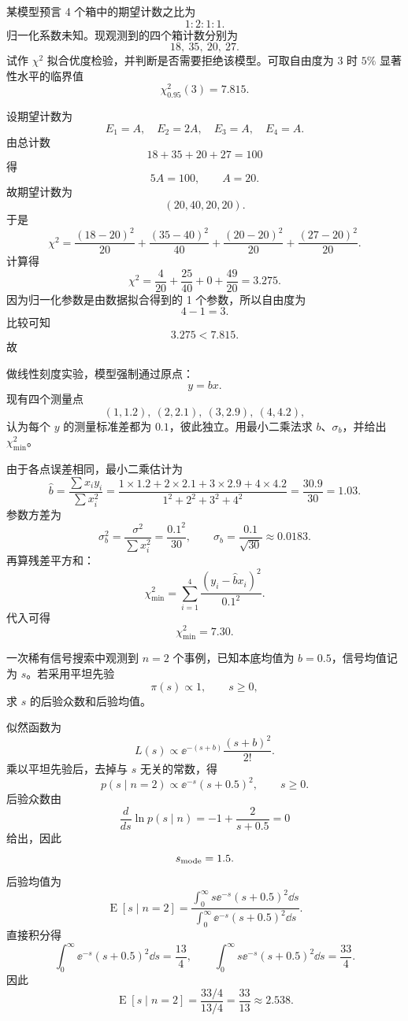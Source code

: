\begin{question}
某模型预言 4 个箱中的期望计数之比为
\[
1:2:1:1.
\]
归一化系数未知。现观测到的四个箱计数分别为
\[
18,\ 35,\ 20,\ 27.
\]
试作 $\chi^2$ 拟合优度检验，并判断是否需要拒绝该模型。可取自由度为 3 时 $5\%$ 显著性水平的临界值
\[
\chi^2_{0.95}(3)=7.815.
\]
\begin{solution}
设期望计数为
\[
E_1=A,\quad E_2=2A,\quad E_3=A,\quad E_4=A.
\]
由总计数
\[
18+35+20+27=100
\]
得
\[
5A=100,
\qquad A=20.
\]
故期望计数为
\[
(20,40,20,20).
\]
于是
\[
\chi^2=\frac{(18-20)^2}{20}+\frac{(35-40)^2}{40}+\frac{(20-20)^2}{20}+\frac{(27-20)^2}{20}.
\]
计算得
\[
\chi^2=\frac4{20}+\frac{25}{40}+0+\frac{49}{20}=3.275.
\]
因为归一化参数是由数据拟合得到的 1 个参数，所以自由度为
\[
4-1=3.
\]
比较可知
\[
3.275<7.815.
\]
故
\end{solution}
\end{question}

\begin{question}
做线性刻度实验，模型强制通过原点：
\[
y=bx.
\]
现有四个测量点
\[
(1,1.2),\ (2,2.1),\ (3,2.9),\ (4,4.2),
\]
认为每个 $y$ 的测量标准差都为 $0.1$，彼此独立。用最小二乘法求 $b$、$\sigma_b$，并给出 $\chi^2_{\min}$。
\begin{solution}
由于各点误差相同，最小二乘估计为
\[
\hat b=\frac{\sum x_i y_i}{\sum x_i^2}
=\frac{1\times1.2+2\times2.1+3\times2.9+4\times4.2}{1^2+2^2+3^2+4^2}
=\frac{30.9}{30}=1.03.
\]
参数方差为
\[
\sigma_b^2=\frac{\sigma^2}{\sum x_i^2}=\frac{0.1^2}{30},
\qquad
\sigma_b=\frac{0.1}{\sqrt{30}}\approx 0.0183.
\]
再算残差平方和：
\[
\chi^2_{\min}=\sum_{i=1}^4\frac{(y_i-\hat b x_i)^2}{0.1^2}.
\]
代入可得
\[
\chi^2_{\min}=7.30.
\]
\end{solution}
\end{question}

\begin{question}
一次稀有信号搜索中观测到 $n=2$ 个事例，已知本底均值为 $b=0.5$，信号均值记为 $s$。若采用平坦先验
\[
\pi(s)\propto 1,
\qquad s\ge 0,
\]
求 $s$ 的后验众数和后验均值。
\begin{solution}
似然函数为
\[
L(s)\propto \ee^{-(s+b)}\frac{(s+b)^2}{2!}.
\]
乘以平坦先验后，去掉与 $s$ 无关的常数，得
\[
p(s\mid n=2)\propto \ee^{-s}(s+0.5)^2,
\qquad s\ge 0.
\]
后验众数由
\[
\frac{d}{ds}\ln p(s\mid n)= -1+\frac{2}{s+0.5}=0
\]
给出，因此
\[
s_{\rm mode}=1.5.
\]
后验均值为
\[
\operatorname{E}[s\mid n=2]=\frac{\int_0^{\infty} s \ee^{-s}(s+0.5)^2\dd{s}}{\int_0^{\infty} \ee^{-s}(s+0.5)^2\dd{s}}.
\]
直接积分得
\[
\int_0^{\infty} \ee^{-s}(s+0.5)^2\dd{s}=\frac{13}{4},
\qquad
\int_0^{\infty} s \ee^{-s}(s+0.5)^2\dd{s}=\frac{33}{4}.
\]
因此
\[
\operatorname{E}[s\mid n=2]=\frac{33/4}{13/4}=\frac{33}{13}\approx 2.538.
\]
\end{solution}
\end{question}

